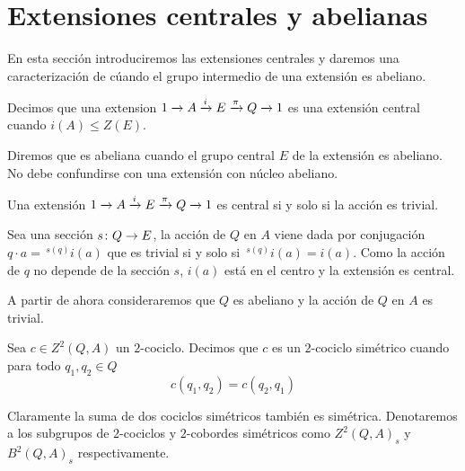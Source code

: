
\section{Extensiones centrales y abelianas}

En esta sección introduciremos las extensiones centrales y daremos una caracterización de cúando el grupo intermedio de una extensión es abeliano.

\begin{definicion}
	Decimos que una extension $\extension i \pi A E Q$ es una extensión central cuando $i(A)\leq Z(E)$. 
	
	Diremos que es abeliana cuando el grupo central $E$ de la extensión es abeliano. No debe confundirse con una extensión con núcleo abeliano.
\end{definicion}

\begin{proposicion}
	Una extensión $\extension i \pi A E Q$ es central si y solo si la acción es trivial.
	\begin{demostracion}
		Sea una sección $\homo s Q E$, la acción de $Q$ en $A$ viene dada por conjugación $q\cdot a = \,^{s(q)}i(a)$ que es trivial si y solo si $\,^{s(q)}i(a) = i(a)$. Como la acción de $q$ no depende de la sección $s$, $i(a)$ está en el centro y la extensión es central.
	\end{demostracion}
\end{proposicion}

A partir de ahora consideraremos que $Q$ es abeliano y la acción de $Q$ en $A$ es trivial.

\begin{definicion}
	Sea $c\in Z^2(Q,A)$ un $2$-cociclo. Decimos que $c$ es un $2$-cociclo simétrico cuando para todo $q_1,q_2\in Q$
	\begin{equation*}
		c(q_1,q_2)=c(q_2,q_1)
	\end{equation*}
	
	Claramente la suma de dos cociclos simétricos también es simétrica. Denotaremos a los subgrupos de $2$-cociclos y $2$-cobordes simétricos como $Z^2(Q,A)_s$ y $B^2(Q,A)_s$ respectivamente.
\end{definicion}


